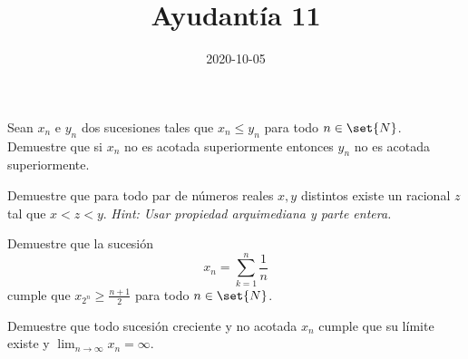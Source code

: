 \documentclass{ayudantia}
\title{Ayudantía 11}
\date{2020-10-05}
\begin{document}
\maketitle

\begin{prob}
    Sean \(x_n\) e \(y_n\) dos sucesiones tales que \(x_n\leq y_n\) para todo \(n\in\set{N}\). Demuestre que si \(x_n\) no es acotada superiormente entonces \(y_n\) no es acotada superiormente.
\end{prob}

\begin{ans}
    \begin{sol}

    \end{sol}
\end{ans}


\begin{prob}
    Demuestre que para todo par de números reales \(x,y\) distintos existe un racional \(z\) tal que \(x<z<y\).
    \textit{Hint: Usar propiedad arquimediana y parte entera.}
\end{prob}

\begin{ans}
    \begin{sol}

    \end{sol}
\end{ans}


\begin{prob}
    Demuestre que la sucesión
    \begin{equation*}
        x_n=\sum_{k=1}^n\frac1n
    \end{equation*}
    cumple que \(x_{2^n}\geq\frac{n+1}2\) para todo \(n\in\set{N}\).
\end{prob}

\begin{ans}
    \begin{sol}

    \end{sol}
\end{ans}


\begin{prob}
    Demuestre que todo sucesión creciente y no acotada \(x_n\) cumple que su límite existe y \(\lim_{n\rightarrow\infty}x_n=\infty\).
\end{prob}

\begin{ans}
    \begin{sol}

    \end{sol}
\end{ans}
\end{document}
